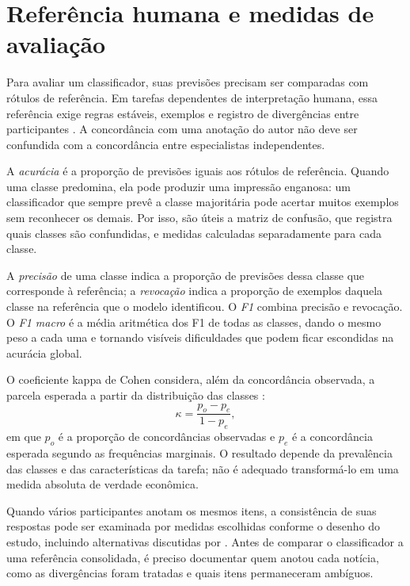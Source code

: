 \section{Referência humana e medidas de avaliação}

Para avaliar um classificador, suas previsões precisam ser comparadas com rótulos de referência. Em tarefas dependentes de interpretação humana, essa referência exige regras estáveis, exemplos e registro de divergências entre participantes \cite{artstein2008agreement}. A concordância com uma anotação do autor não deve ser confundida com a concordância entre especialistas independentes.

A \emph{acurácia} é a proporção de previsões iguais aos rótulos de referência. Quando uma classe predomina, ela pode produzir uma impressão enganosa: um classificador que sempre prevê a classe majoritária pode acertar muitos exemplos sem reconhecer os demais. Por isso, são úteis a matriz de confusão, que registra quais classes são confundidas, e medidas calculadas separadamente para cada classe.

A \emph{precisão} de uma classe indica a proporção de previsões dessa classe que corresponde à referência; a \emph{revocação} indica a proporção de exemplos daquela classe na referência que o modelo identificou. O \emph{F1} combina precisão e revocação. O \emph{F1 macro} é a média aritmética dos F1 de todas as classes, dando o mesmo peso a cada uma e tornando visíveis dificuldades que podem ficar escondidas na acurácia global.

O coeficiente kappa de Cohen considera, além da concordância observada, a parcela esperada a partir da distribuição das classes \cite{cohen1960kappa}:
\begin{equation}
    \kappa = \frac{p_o-p_e}{1-p_e},
\end{equation}
\noindent em que $p_o$ é a proporção de concordâncias observadas e $p_e$ é a concordância esperada segundo as frequências marginais. O resultado depende da prevalência das classes e das características da tarefa; não é adequado transformá-lo em uma medida absoluta de verdade econômica.

Quando vários participantes anotam os mesmos itens, a consistência de suas respostas pode ser examinada por medidas escolhidas conforme o desenho do estudo, incluindo alternativas discutidas por . Antes de comparar o classificador a uma referência consolidada, é preciso documentar quem anotou cada notícia, como as divergências foram tratadas e quais itens permaneceram ambíguos.

